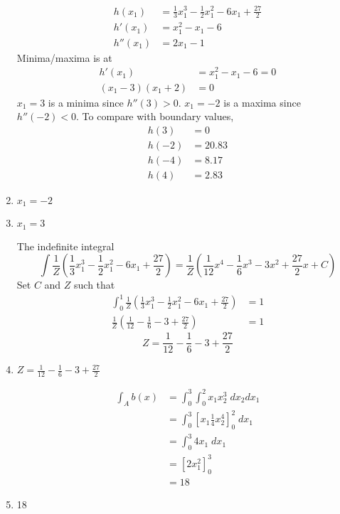 \documentclass[11pt]{scrartcl}
\begin{document}
\begin{enumerate}
\begin{align*}
h(x_1) &= \frac{1}{3}x_1^3 - \frac{1}{2}x_1^2 - 6x_1 + \frac{27}{2} \\
h'(x_1) &= x_1^2 - x_1 - 6 \\
h''(x_1) &= 2x_1 - 1
\end{align*}
Minima/maxima is at
\begin{align*}
h'(x_1) &= x_1^2 - x_1 - 6 = 0 \\
(x_1 - 3)(x_1+2) &= 0
\end{align*}
$x_1 = 3$ is a minima since $h''(3) > 0$. $x_1 = -2$ is a maxima since $h''(-2) < 0$. 
To compare with boundary values, 
\begin{align*}
h(3) &= 0 \\
h(-2) &= 20.83 \\
h(-4) &= 8.17 \\
h(4) &= 2.83 
\end{align*}
\item $x_1 = -2$

\item $x_1 = 3$

The indefinite integral 
\[\int \frac{1}{Z} \left(\frac{1}{3}x_1^3 - \frac{1}{2}x_1^2 - 6x_1 + \frac{27}{2} \right) = \frac{1}{Z} \left(\frac{1}{12}x^4 - \frac{1}{6}x^3 - 3x^2 + \frac{27}{2}x + C\right)\]
Set $C$ and $Z$ such that 
\begin{align*}
\int^1_0 \frac{1}{Z} \left(\frac{1}{3}x_1^3 - \frac{1}{2}x_1^2 - 6x_1 + \frac{27}{2} \right) &= 1 \\
\frac{1}{Z} \left(\frac{1}{12} - \frac{1}{6} - 3 + \frac{27}{2}\right) &= 1
\end{align*}
\[Z = \frac{1}{12} - \frac{1}{6} - 3 + \frac{27}{2}\]
\item $Z = \frac{1}{12} - \frac{1}{6} - 3 + \frac{27}{2}$

\begin{align*}
\int_A b(x) &= \int^3_0 \int^2_0 x_1 x_2^3 \; dx_2 dx_1 \\
&= \int^3_0 \left[ x_1 \frac{1}{4} x_2^4 \right]^2_0 \; dx_1 \\
&= \int^3_0 4 x_1 \; dx_1 \\
&= \left[ 2 x_1^2 \right]^3_0 \\
&= 18
\end{align*}
\item 18 


\end{enumerate}
\end{document}
